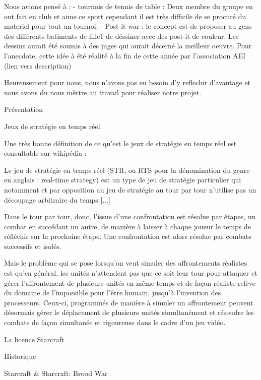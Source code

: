     Nous avions pensé à :
      - tournois de tennis de table : Deux membre du groupe en ont fait
    en club et aime ce sport cependant il est très difficile de se procuré
    du materiel pour tout un tournoi.
      - Post-it war : le concept est de proposer au gens des différents
    batiments de lille1 de déssiner avec des post-it de couleur. Les dessins
    aurait été soumis à des juges qui aurait décerné la meilleur oeuvre.
    Pour l'anecdote, cette idée à été réalité à la fin de cette année par
    l'association AEI (lien vers description)

    Heureusement pour nous, nous n'avons pas eu besoin d'y reflechir
    d'avantage et nous avons du nous mêttre au travail pour réaliser notre
    projet.

Présentation

    Jeux de stratégie en temps réel

      Une très bonne définition de ce qu'est le jeux de stratégie en
      temps réel est consultable sur wikipédia :

        Le jeu de stratégie en temps réel (STR, ou RTS pour la
        dénomination du genre en anglais : real-time strategy) est un type de
        jeu de stratégie particulier qui notamment et par opposition au jeu de
        stratégie au tour par tour n’utilise pas un découpage arbitraire du
        temps [...]

        Dans le tour par tour, donc, l’issue d’une confrontation est résolue par
        étapes, un combat en succédant un autre, de manière à laisser à chaque
        joueur le temps de réfléchir sur la prochaine étape. Une confrontation
        est alors résolue par combats successifs et isolés.

        Mais le problème qui se pose lorsqu’on veut simuler des affrontements
        réalistes est qu’en général, les unités n’attendent pas que ce soit leur
        tour pour attaquer et gérer l’affrontement de plusieurs unités en même
        temps et de façon réaliste relève du domaine de l’impossible pour l’être
        humain, jusqu’à l’invention des processeurs. Ceux-ci, programmés de
        manière à simuler un affrontement peuvent désormais gérer le déplacement
        de plusieurs unités simultanément et résoudre les combats de façon
        simultanée et rigoureuse dans le cadre d’un jeu vidéo.

    La licence Starcraft

      Historique

        Starcraft & Starcraft: Brood War

